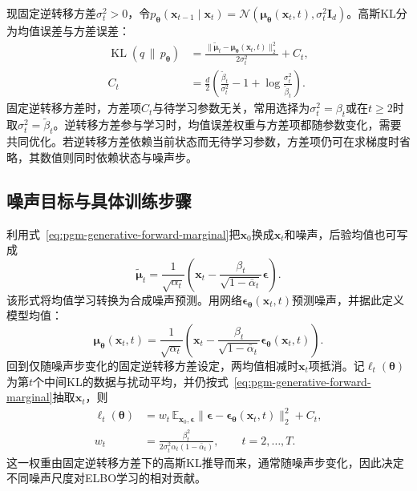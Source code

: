 现固定逆转移方差$\sigma_t^2>0$，令$p_{\bm{\theta}}(\bm{x}_{t-1}\mid\bm{x}_t)=\mathcal{N}(\bm{\mu}_{\bm{\theta}}(\bm{x}_t,t),\sigma_t^2\bm{I}_d)$。高斯KL分为均值误差与方差误差：
\begin{equation}
  \label{eq:pgm-generative-gaussian-step-kl}
  \begin{aligned}
    \operatorname{KL}(q\,\|\,p_{\bm{\theta}})
      &=\frac{\lVert\widetilde{\bm{\mu}}_t
                    -\bm{\mu}_{\bm{\theta}}(\bm{x}_t,t)\rVert_2^2}
               {2\sigma_t^2}+C_t,\\
    C_t&=\frac{d}{2}
       \left(\frac{\widetilde{\beta}_t}{\sigma_t^2}
              -1+\log\frac{\sigma_t^2}{\widetilde{\beta}_t}\right).
  \end{aligned}
\end{equation}
固定逆转移方差时，方差项$C_t$与待学习参数无关，常用选择为$\sigma_t^2=\beta_t$或在$t\geq2$时取$\sigma_t^2=\widetilde{\beta}_t$。逆转移方差参与学习时，均值误差权重与方差项都随参数变化，需要共同优化。若逆转移方差依赖当前状态而无待学习参数，方差项仍可在求梯度时省略，其数值则同时依赖状态与噪声步。

\subsection{噪声目标与具体训练步骤}
\label{sec:pgm-generative-noise-training}

利用式~\eqref{eq:pgm-generative-forward-marginal}把$\bm{x}_0$换成$\bm{x}_t$和噪声，后验均值也可写成
\[
  \widetilde{\bm{\mu}}_t
  =\frac{1}{\sqrt{\alpha_t}}
       \left(\bm{x}_t-
          \frac{\beta_t}{\sqrt{1-\bar{\alpha}_t}}\bm{\epsilon}\right).
\]
该形式将均值学习转换为合成噪声预测。用网络$\bm{\epsilon}_{\bm{\theta}}(\bm{x}_t,t)$预测噪声，并据此定义模型均值：
\begin{equation}
  \label{eq:pgm-generative-noise-parameterization}
  \bm{\mu}_{\bm{\theta}}(\bm{x}_t,t)
  =\frac{1}{\sqrt{\alpha_t}}
       \left(\bm{x}_t-
          \frac{\beta_t}{\sqrt{1-\bar{\alpha}_t}}
               \bm{\epsilon}_{\bm{\theta}}(\bm{x}_t,t)\right).
\end{equation}
回到仅随噪声步变化的固定逆转移方差设定，两均值相减时$\bm{x}_t$项抵消。记$\ell_t(\bm{\theta})$为第$t$个中间KL的数据与扰动平均，并仍按式~\eqref{eq:pgm-generative-forward-marginal}抽取$\bm{x}_t$，则
\begin{equation}
  \label{eq:pgm-generative-weighted-denoising}
  \begin{aligned}
    \ell_t(\bm{\theta})
      &=w_t\,\mathbb{E}_{\bm{x}_0,\bm{\epsilon}}
         \lVert\bm{\epsilon}
          -\bm{\epsilon}_{\bm{\theta}}(\bm{x}_t,t)\rVert_2^2+C_t,\\
    w_t&=\frac{\beta_t^2}
              {2\sigma_t^2\alpha_t(1-\bar{\alpha}_t)},
          \qquad t=2,\ldots,T.
  \end{aligned}
\end{equation}
这一权重由固定逆转移方差下的高斯KL推导而来，通常随噪声步变化，因此决定不同噪声尺度对ELBO学习的相对贡献。

